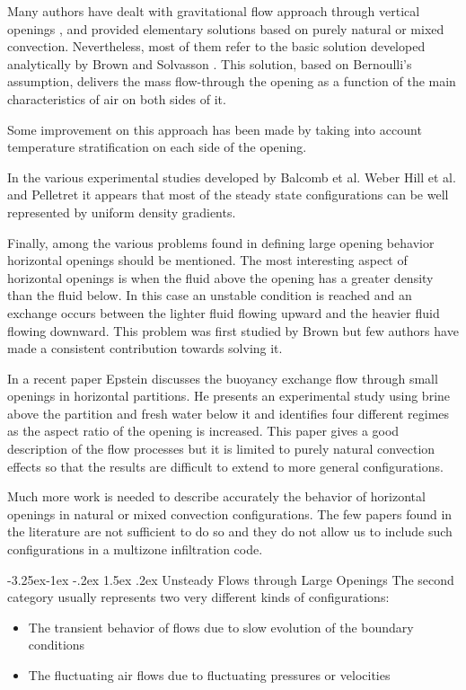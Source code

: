 \documentclass[12pt]{report}
\makeatletter
\renewcommand\paragraph{\@startsection{paragraph}{4}{\z@}%
                                      {-3.25ex\@plus -1ex \@minus -.2ex}%
                                      {1.5ex \@plus .2ex}
                                      {\normalfont\normalsize\bfseries}}
\makeatother
\begin{document}
Many authors have dealt with gravitational flow approach through vertical openings
\cite{shaw_whyte_1974}, \cite{brown_solvasson_1962, shaw_1976, lidwell_1977} and provided
elementary solutions based on purely natural or
mixed convection. Nevertheless, most of them refer to the basic solution
developed analytically by Brown and Solvasson \cite{brown_solvasson_1962}. This solution, based on
Bernoulli’s assumption, delivers the mass flow-through the opening as a function
of the main characteristics of air on both sides of it.

Some improvement on this approach has been made by taking into account temperature stratification on each side of the opening.

In the various experimental studies developed by Balcomb et al. \cite{balcomb_yamaguchi_1983} Weber \cite{weber_1980}
Hill et al. \cite{hill_et_al_1986} and Pelletret \cite{pelletret_khodr_1989} it appears that
most of the steady state configurations can be well represented by uniform density gradients. 

Finally, among the various problems found in defining large opening behavior
horizontal openings should be mentioned. The most interesting aspect of horizontal openings is when the fluid above the opening has a greater density than the
fluid below. In this case an unstable condition is reached and an exchange occurs
between the lighter fluid flowing upward and the heavier fluid flowing downward. This problem was first studied
by Brown \cite{brown_1962} but few authors have made a consistent contribution towards solving it.

In a recent paper Epstein \cite{epstein_1988} discusses the buoyancy exchange flow through
small openings in horizontal partitions. He presents an experimental study using
brine above the partition and fresh water below it and identifies four different
regimes as the aspect ratio of the opening is increased. This paper gives a good
description of the flow processes but it is limited to purely natural convection
effects so that the results are difficult to extend to more general configurations.

Much more work is needed to describe accurately the behavior of horizontal
openings in natural or mixed convection configurations. The few papers found in
the literature are not sufficient to do so and they do not allow us to include such
configurations in a multizone infiltration code.
 
\paragraph{Unsteady Flows through Large Openings}
The second category usually represents two very different kinds of configurations:
\begin{itemize}
\item The transient behavior of flows due to slow evolution of the boundary conditions
\item The fluctuating air flows due to fluctuating pressures or velocities
\end{itemize}
\end{document}
